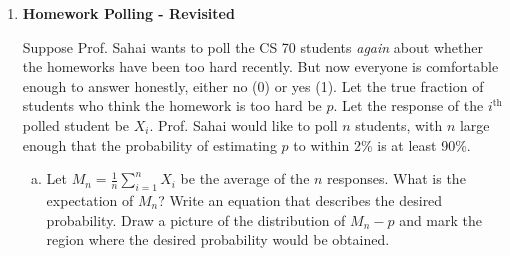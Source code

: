 \documentclass[11pt]{article}
\begin{document}
\maketitle


\begin{enumerate}


\item {\bf Homework Polling - Revisited} 

Suppose Prof. Sahai wants to poll the CS 70 students {\em again} about whether the homeworks have been too hard recently.  But now everyone is comfortable enough to answer honestly, either no (0) or yes (1). Let the true fraction of students who think the homework is too hard be $p$. Let the response of the $i^{\text{th}}$ polled student be $X_i$.  Prof. Sahai would like to poll $n$ students, with $n$ large enough that the probability of estimating $p$ to within 2\% is at least 90\%.

\begin{enumerate}[a)]

\item Let $M_n = \frac{1}{n}\sum_{i=1}^n X_i$ be the average of the $n$ responses. What is the expectation of $M_n$? Write an equation that describes the desired probability. Draw a picture of the distribution of $M_n - p$ and mark the region where the desired probability would be obtained.

\vspace{20mm}

\end{enumerate}

\end{enumerate}
\end{document}
